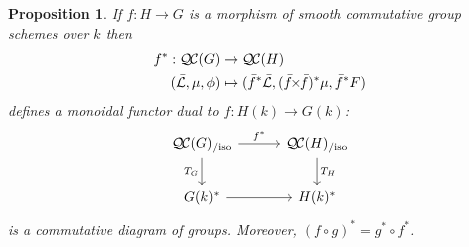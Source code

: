 \documentclass{amsart}
\theoremstyle{plain}
\newtheorem{proposition}[theorem]{Proposition}
\theoremstyle{definition}
\theoremstyle{remark}
\newcommand{\Fq}{k}
\newcommand{\gqcs}[1]{{\mathcal{\bar #1}}}
\newcommand{\QC}{{\mathcal{Q\hskip-0.8pt C}}}
\newcommand{\QCiso}[1]{\QC(#1)_{/\text{iso}}}
\newcommand{\TrFrob}[1]{T_{#1}}
\renewcommand{\bf}{\bar{f}}
\newcommand{\tight}[3]{\hspace{-#1pt}{#2}\hspace{-#3pt}}
\newcommand{\bfxf}{\text{$\bar{f} \tight{1}{\times}{1} \bar{f}$}}
\begin{document}
\begin{proposition}\label{prop:pullback}
  If $f : H\to G$ is a morphism of smooth commutative group schemes over $\Fq$ then
  \begin{align*}
  f^* : \QC(G) &\to \QC(H) \\
  (\gqcs{L},\mu,\phi) &\mapsto (\bf^*\gqcs{L},(\bfxf)^*\mu,\bf^*F)
  \end{align*}
  defines a monoidal functor dual to $f \colon H(\Fq) \to G(\Fq)$:
  \[
  \begin{tikzcd}[row sep=20, column sep=30]
   \QCiso{G} \rar{f^*} \arrow[swap]{d}{\TrFrob{G}} & \QCiso{H} \dar{\TrFrob{H}} \\
   G(\Fq)^* \rar & H(\Fq)^*
  \end{tikzcd}
  \]
  is a commutative diagram of groups.  Moreover, $(f\circ g)^* = g^* \circ f^*$.
\end{proposition}
\end{document}
